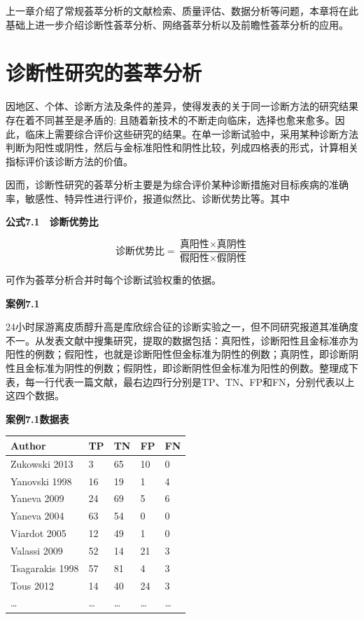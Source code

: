 \documentclass[
  chinese-hans,
  letterpaper,
  DIV=11,
  numbers=noendperiod]{scrreprt}
\newcounter{none} %
\begin{document}
上一章介绍了常规荟萃分析的文献检索、质量评估、数据分析等问题，本章将在此基础上进一步介绍诊断性荟萃分析、网络荟萃分析以及前瞻性荟萃分析的应用。

\section{诊断性研究的荟萃分析}\label{ux8bcaux65adux6027ux7814ux7a76ux7684ux835fux8403ux5206ux6790}

因地区、个体、诊断方法及条件的差异，使得发表的关于同一诊断方法的研究结果存在着不同甚至是矛盾的;
且随着新技术的不断走向临床，选择也愈来愈多。因此，临床上需要综合评价这些研究的结果。在单一诊断试验中，采用某种诊断方法判断为阳性或阴性，然后与金标准阳性和阴性比较，列成四格表的形式，计算相关指标评价该诊断方法的价值。

因而，诊断性研究的荟萃分析主要是为综合评价某种诊断措施对目标疾病的准确率，敏感性、特异性进行评价，报道似然比、诊断优势比等。其中

\textbf{公式7.1　诊断优势比}

\[\text{诊断优势比} = \frac{\text{真阳性}\times\text{真阴性}}{\text{假阳性}\times\text{假阴性}}\]

可作为荟萃分析合并时每个诊断试验权重的依据。

\textbf{案例7.1}

24小时尿游离皮质醇升高是库欣综合征的诊断实验之一，但不同研究报道其准确度不一。从发表文献中搜集研究，提取的数据包括：真阳性，诊断阳性且金标准亦为阳性的例数；假阳性，也就是诊断阳性但金标准为阴性的例数；真阴性，即诊断阴性且金标准为阴性的例数；假阴性，即诊断阴性但金标准为阳性的例数。整理成下表，每一行代表一篇文献，最右边四行分别是TP、TN、FP和FN，分别代表以上这四个数据。

\textbf{案例7.1数据表}

{\def\LTcaptype{none} %
\begin{longtable}[]{@{}lllll@{}}
\toprule\noalign{}
Author & TP & TN & FP & FN \\
\midrule\noalign{}
\endhead
\bottomrule\noalign{}
\endlastfoot
Zukowski 2013 & 3 & 65 & 10 & 0 \\
Yanovski 1998 & 16 & 19 & 1 & 4 \\
Yaneva 2009 & 24 & 69 & 5 & 6 \\
Yaneva 2004 & 63 & 54 & 0 & 0 \\
Viardot 2005 & 12 & 49 & 1 & 0 \\
Valassi 2009 & 52 & 14 & 21 & 3 \\
Tsagarakis 1998 & 57 & 81 & 4 & 3 \\
Tous 2012 & 14 & 40 & 24 & 3 \\
\ldots{} & \ldots{} & \ldots{} & \ldots{} & \ldots{} \\
\end{longtable}
}
\end{document}
